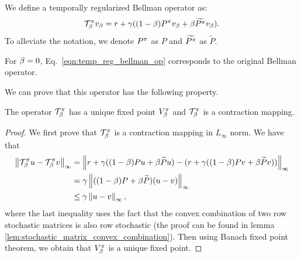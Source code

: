 We define a temporally regularized Bellman operator as:
\begin{equation}
\label{eqn:temp_reg_bellman_op}
    \mathcal{T}^{\pi}_{\beta} v_{\beta} = r + \gamma ((1-\beta) P^{\pi}v_{\beta} + \beta \widetilde{P^{\pi}} v_{\beta}).
\end{equation}
To alleviate the notation, we denote $P^{\pi}$ as $P$ and $\widetilde{P^{\pi}}$ as $\widetilde{P}$.
\begin{remark}
For $\beta =0$, Eq.~\ref{eqn:temp_reg_bellman_op} corresponds to the original Bellman operator.
\end{remark}
We can prove that this operator has the following property.
\begin{theorem}
The operator $\mathcal{T}^{\pi}_{\beta}$ has a unique fixed point $V_{\beta}^{\pi}$ and $\mathcal{T}^{\pi}_{\beta}$ is a contraction mapping.
\end{theorem}
\begin{proof}
We first prove that $\mathcal{T}^{\pi}_{\beta}$ is a contraction mapping in $L_\infty$ norm. We have that
\begin{equation}
\begin{split}
    \left\lVert\mathcal{T}^{\pi}_{\beta} u - \mathcal{T}^{\pi}_{\beta} v\right\rVert_{\infty} &= \left\lVert r+\gamma( (1-\beta) Pu + \beta \widetilde{P}u) - (r+\gamma( (1-\beta) Pv + \beta \widetilde{P}v))\right\rVert_{\infty}\\
    &= \gamma \left\lVert((1-\beta) P + \beta \widetilde{P})(u-v)\right\rVert_{\infty}\\
    &\leq \gamma \left\lVert u-v\right\rVert_{\infty},
\end{split}
\end{equation}
where the last inequality uses the fact that the convex combination of two row stochastic matrices is also row stochastic (the proof can be found in lemma \ref{lem:stochastic_matrix_convex_combination}).
Then using Banach fixed point theorem, we obtain that $V_{\beta}^{\pi}$ is a unique fixed point. 
\end{proof}

